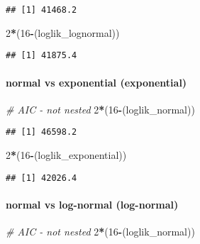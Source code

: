 \documentclass[]{article}
\newenvironment{Shaded}{\begin{snugshade}}{\end{snugshade}}
\newcommand{\CommentTok}[1]{\textcolor[rgb]{0.56,0.35,0.01}{\textit{#1}}}
\newcommand{\DecValTok}[1]{\textcolor[rgb]{0.00,0.00,0.81}{#1}}
\newcommand{\NormalTok}[1]{#1}
\newcommand{\OperatorTok}[1]{\textcolor[rgb]{0.81,0.36,0.00}{\textbf{#1}}}
\let\oldparagraph\paragraph
\renewcommand{\paragraph}[1]{\oldparagraph{#1}\mbox{}}
\begin{document}
\begin{verbatim}
## [1] 41468.2
\end{verbatim}

\begin{Shaded}
\begin{Highlighting}[]
\DecValTok{2}\OperatorTok{*}\NormalTok{(}\DecValTok{16}\OperatorTok{-}\NormalTok{(loglik_lognormal))}
\end{Highlighting}
\end{Shaded}

\begin{verbatim}
## [1] 41875.4
\end{verbatim}

\hypertarget{normal-vs-exponential-exponential}{%
\paragraph{normal vs exponential
(exponential)}\label{normal-vs-exponential-exponential}}

\begin{Shaded}
\begin{Highlighting}[]
\CommentTok{# AIC - not nested}
\DecValTok{2}\OperatorTok{*}\NormalTok{(}\DecValTok{16}\OperatorTok{-}\NormalTok{(loglik_normal))}
\end{Highlighting}
\end{Shaded}

\begin{verbatim}
## [1] 46598.2
\end{verbatim}

\begin{Shaded}
\begin{Highlighting}[]
\DecValTok{2}\OperatorTok{*}\NormalTok{(}\DecValTok{16}\OperatorTok{-}\NormalTok{(loglik_exponential))}
\end{Highlighting}
\end{Shaded}

\begin{verbatim}
## [1] 42026.4
\end{verbatim}

\hypertarget{normal-vs-log-normal-log-normal}{%
\paragraph{normal vs log-normal
(log-normal)}\label{normal-vs-log-normal-log-normal}}

\begin{Shaded}
\begin{Highlighting}[]
\CommentTok{# AIC - not nested}
\DecValTok{2}\OperatorTok{*}\NormalTok{(}\DecValTok{16}\OperatorTok{-}\NormalTok{(loglik_normal))}
\end{Highlighting}
\end{Shaded}
\end{document}
